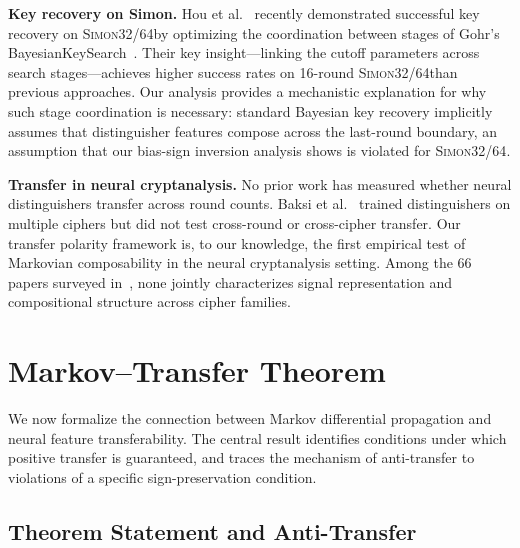 \documentclass[runningheads]{llncs}
\newcommand{\simon}{\textsc{Simon32/64}}
\begin{document}
\textbf{Key recovery on Simon.}
Hou et al.~\cite{hou2025bayesian} recently demonstrated successful key recovery on \simon by optimizing the coordination between stages of Gohr's BayesianKeySearch~\cite{gohr2019}.
Their key insight---linking the cutoff parameters across search stages---achieves higher success rates on 16-round \simon than previous approaches.
Our analysis provides a mechanistic explanation for why such stage coordination is necessary: standard Bayesian key recovery implicitly assumes that distinguisher features compose across the last-round boundary, an assumption that our bias-sign inversion analysis shows is violated for \simon.

\textbf{Transfer in neural cryptanalysis.}
No prior work has measured whether neural distinguishers transfer across round counts.
Baksi et al.~\cite{baksi2022neural} trained distinguishers on multiple ciphers but did not test cross-round or cross-cipher transfer.
Our transfer polarity framework is, to our knowledge, the first empirical test of Markovian composability in the neural cryptanalysis setting.
Among the 66 papers surveyed in~\cite{gerault2024sok}, none jointly characterizes signal representation and compositional structure across cipher families.


\section{Markov--Transfer Theorem}
\label{sec:theorem}

We now formalize the connection between Markov differential propagation and neural feature transferability.
The central result identifies conditions under which positive transfer is guaranteed, and traces the mechanism of anti-transfer to violations of a specific sign-preservation condition.

\subsection{Theorem Statement and Anti-Transfer}
\end{document}
